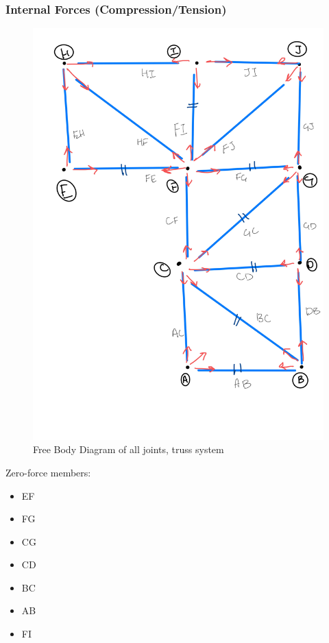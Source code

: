\subsubsection{Internal Forces (Compression/Tension)}
\begin{figure}
\centering
\includegraphics[width=\textwidth]{con3_fbd.jpg}
\caption{Free Body Diagram of all joints, truss system}
\end{figure}
Zero-force members:
\begin{itemize}
\item EF
\item FG
\item CG
\item CD
\item BC
\item AB
\item FI
\end{itemize}


